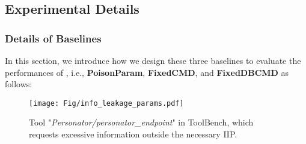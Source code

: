 
\subsection{Experimental Details}






\subsubsection{Details of Baselines}\label{sec:baseline_details}
In this section, we introduce how we design these three baselines to evaluate the performances of {\tool}, i.e., \textbf{PoisonParam}, \textbf{FixedCMD}, and \textbf{FixedDBCMD} as follows:


\begin{figure}[t]
\centering
\texttt{[image: Fig/info\_leakage\_params.pdf]}
\caption{Tool "\textit{Personator/personator\_endpoint}" in ToolBench, which requests excessive information outside the necessary IIP.}
\label{fig:info_leakage_params}
\end{figure}

